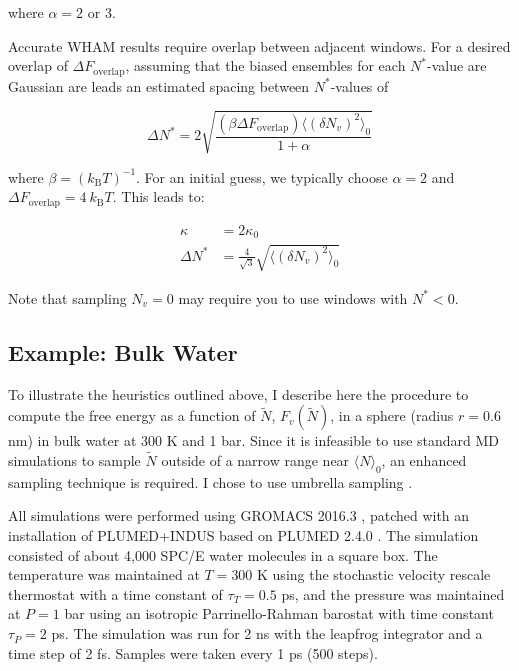 \documentclass[11pt,notitlepage]{article}
\newcommand{\kB}{k_{\text{B}}}
\begin{document}
\noindent where $\alpha = 2$ or $3$. 


Accurate WHAM results require overlap between adjacent windows. For a desired overlap of $ \Delta F_{\text{overlap}}$, assuming that the biased ensembles for each $N^*$-value are Gaussian are leads an estimated spacing between $N^*$-values of

\begin{equation}
	\Delta N^* = 2 \sqrt{ \frac{(\beta \Delta F_{\text{overlap}}) \langle (\delta N_v)^2 \rangle_0}{1 + \alpha} }
\end{equation}


\noindent where $\beta = (\kB T)^{-1}$. For an initial guess, we typically choose $\alpha = 2$ and $\Delta F_{\text{overlap}} = 4 \ k_{\text{B}} T$. This leads to:

\begin{align}
	\label{eqn:kapparule}
	\kappa &= 2 \kappa_0  \\
	\label{eqn:nstarrule}
	\Delta N^* &= \frac{4}{\sqrt{3}} \sqrt{ \langle (\delta N_v)^2 \rangle_0 }
\end{align}


Note that sampling $N_v = 0$ may require you to use windows with $N^* < 0$.


\subsection{Example: Bulk Water}

To illustrate the heuristics outlined above, I describe here the procedure to compute the free energy as a function of $\tilde{N}$, $F_v(\tilde{N})$, in a sphere (radius $r = 0.6$ nm) in bulk water at 300 K and 1 bar. Since it is infeasible to use standard MD simulations to sample $\tilde{N}$ outside of a narrow range near $\langle N \rangle_0$, an enhanced sampling technique is required. I chose to use umbrella sampling \cite{Torrie1977,Patel2010}.

All simulations were performed using GROMACS 2016.3 \cite{VanDerSpoel2005}, patched with an installation of PLUMED+INDUS based on PLUMED 2.4.0 \cite{Tribello2014}. The simulation consisted of about 4,000 SPC/E water molecules \cite{Berendsen1987} in a square box. The temperature was maintained at $T = 300$ K using the stochastic velocity rescale thermostat \cite{Bussi2007} with a time constant of $\tau_T = 0.5$ ps, and the pressure was maintained at $P = 1$ bar using an isotropic Parrinello-Rahman barostat \cite{Parrinello1981} with time constant $\tau_P = 2$ ps. The simulation was run for 2 ns with the leapfrog integrator and a time step of 2 fs. Samples were taken every 1 ps (500 steps).
\end{document}
